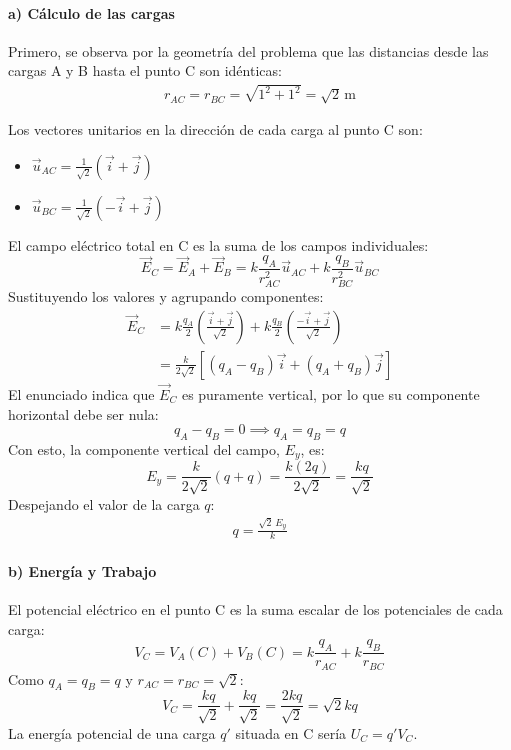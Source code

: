 \paragraph*{a) Cálculo de las cargas}
Primero, se observa por la geometría del problema que las distancias desde las cargas A y B hasta el punto C son idénticas:
\begin{gather*}
    r_{AC} = r_{BC} = \sqrt{1^2 + 1^2} = \sqrt{2} \, \text{m}
\end{gather*}

Los vectores unitarios en la dirección de cada carga al punto C son:
\begin{itemize}
    \setlength{\itemsep}{0pt}\setlength{\parskip}{0pt}
    \item $\vec{u}_{AC} = \frac{1}{\sqrt{2}}(\vec{i}+\vec{j})$
    \item $\vec{u}_{BC} = \frac{1}{\sqrt{2}}(-\vec{i}+\vec{j})$
\end{itemize}

\medskip
El campo eléctrico total en C es la suma de los campos individuales:
$$ \vec{E}_C = \vec{E}_A + \vec{E}_B = k \frac{q_A}{r_{AC}^2} \vec{u}_{AC} + k \frac{q_B}{r_{BC}^2} \vec{u}_{BC} $$
Sustituyendo los valores y agrupando componentes:
\begin{align*}
    \vec{E}_C &= k \frac{q_A}{2} \left( \frac{\vec{i}+\vec{j}}{\sqrt{2}} \right) + k \frac{q_B}{2} \left( \frac{-\vec{i}+\vec{j}}{\sqrt{2}} \right) \\
    &= \frac{k}{2\sqrt{2}} \left[ (q_A-q_B)\vec{i} + (q_A+q_B)\vec{j} \right]
\end{align*}
El enunciado indica que $\vec{E}_C$ es puramente vertical, por lo que su componente horizontal debe ser nula:
$$ q_A - q_B = 0 \implies q_A = q_B = q $$
Con esto, la componente vertical del campo, $E_y$, es:
$$ E_y = \frac{k}{2\sqrt{2}}(q+q) = \frac{k(2q)}{2\sqrt{2}} = \frac{kq}{\sqrt{2}} $$
Despejando el valor de la carga $q$:
\begin{gather}
    q = \frac{\sqrt{2} \, E_y}{k}
\end{gather}

\paragraph*{b) Energía y Trabajo}
El potencial eléctrico en el punto C es la suma escalar de los potenciales de cada carga:
$$ V_C = V_A(C) + V_B(C) = k\frac{q_A}{r_{AC}} + k\frac{q_B}{r_{BC}} $$
Como $q_A=q_B=q$ y $r_{AC}=r_{BC}=\sqrt{2}$:
$$ V_C = \frac{k q}{\sqrt{2}} + \frac{k q}{\sqrt{2}} = \frac{2kq}{\sqrt{2}} = \sqrt{2}kq $$
La energía potencial de una carga $q'$ situada en C sería $U_C = q' V_C$.

